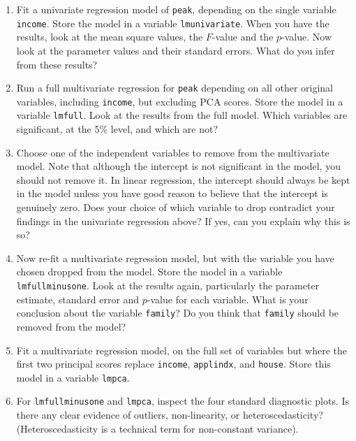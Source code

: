 \begin{enumerate}
\begin{enumerate}
\item Fit a univariate regression model of {\tt peak}, depending on the single variable {\tt income}. Store the model in a variable \texttt{lmunivariate}. When you have the results,
look at the mean square values, the $F$-value and the $p$-value. Now look at the parameter values and their standard errors. What do you infer from these results?

\item Run a full multivariate regression for {\tt peak} depending on all other original variables, including {\tt income}, but excluding PCA scores. Store the model in a variable \texttt{lmfull}.
Look at the results from the full model. Which variables are significant, at the 5\% level, and which are not?

\item Choose one of the independent variables to remove from the multivariate model.
Note that although the intercept is not significant in the model,
you should not remove it. In linear regression,
the intercept should always be kept in the model unless you have good reason to believe that the intercept is genuinely zero.
Does your choice of which variable to drop contradict your findings in the univariate regression above?
If yes, can you explain why this is so?

\item Now re-fit a multivariate regression model, but with the variable you have chosen
dropped from the model. Store the model in a variable \texttt{lmfullminusone}.
Look at the results again, particularly the parameter estimate,
standard error and $p$-value for each variable. What is your conclusion about the variable
{\tt family}?  Do you think that {\tt family} should be removed from the
model?

\item Fit a multivariate regression model, on the full set of variables but where the first two principal scores replace {\tt income}, {\tt applindx}, and {\tt house}. Store this model in a variable \texttt{lmpca}.

\item For \texttt{lmfullminusone} and \texttt{lmpca}, inspect the four standard diagnostic plots. Is there any clear evidence of outliers, non-linearity, or heteroscedasticity? (Heteroscedasticity is a technical term for non-constant variance).
\end{enumerate}


\end{enumerate}
